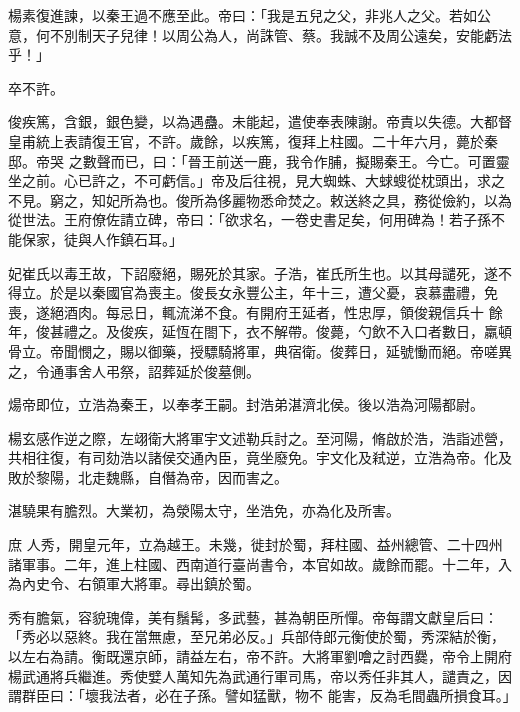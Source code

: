 \begin{pinyinscope}
 楊素復進諫，以秦王過不應至此。帝曰：「我是五兒之父，非兆人之父。若如公意，何不別制天子兒律！以周公為人，尚誅管、蔡。我誠不及周公遠矣，安能虧法乎！」



 卒不許。



 俊疾篤，含銀，銀色變，以為遇蠱。未能起，遣使奉表陳謝。帝責以失德。大都督皇甫統上表請復王官，不許。歲餘，以疾篤，復拜上柱國。二十年六月，薨於秦邸。帝哭
 之數聲而已，曰：「晉王前送一鹿，我令作脯，擬賜秦王。今亡。可置靈坐之前。心已許之，不可虧信。」帝及后往視，見大蜘蛛、大蛷螋從枕頭出，求之不見。窮之，知妃所為也。俊所為侈麗物悉命焚之。敕送終之具，務從儉約，以為從世法。王府僚佐請立碑，帝曰：「欲求名，一卷史書足矣，何用碑為！若子孫不能保家，徒與人作鎮石耳。」



 妃崔氏以毒王故，下詔廢絕，賜死於其家。子浩，崔氏所生也。以其母譴死，遂不得立。於是以秦國官為喪主。俊長女永豐公主，年十三，遭父憂，哀慕盡禮，免喪，遂絕酒肉。每忌日，輒流涕不食。有開府王延者，性忠厚，領俊親信兵十
 餘年，俊甚禮之。及俊疾，延恆在閤下，衣不解帶。俊薨，勺飲不入口者數日，羸頓骨立。帝聞憫之，賜以御藥，授驃騎將軍，典宿衛。俊葬日，延號慟而絕。帝嗟異之，令通事舍人弔祭，詔葬延於俊墓側。



 煬帝即位，立浩為秦王，以奉孝王嗣。封浩弟湛濟北侯。後以浩為河陽都尉。



 楊玄感作逆之際，左翊衛大將軍宇文述勒兵討之。至河陽，脩啟於浩，浩詣述營，共相往復，有司劾浩以諸侯交通內臣，竟坐廢免。宇文化及弒逆，立浩為帝。化及敗於黎陽，北走魏縣，自僭為帝，因而害之。



 湛驍果有膽烈。大業初，為滎陽太守，坐浩免，亦為化及所害。



 庶
 人秀，開皇元年，立為越王。未幾，徙封於蜀，拜柱國、益州總管、二十四州諸軍事。二年，進上柱國、西南道行臺尚書令，本官如故。歲餘而罷。十二年，入為內史令、右領軍大將軍。尋出鎮於蜀。



 秀有膽氣，容貌瑰偉，美有鬚髯，多武藝，甚為朝臣所憚。帝每謂文獻皇后曰：「秀必以惡終。我在當無慮，至兄弟必反。」兵部侍郎元衡使於蜀，秀深結於衡，以左右為請。衡既還京師，請益左右，帝不許。大將軍劉噲之討西爨，帝令上開府楊武通將兵繼進。秀使嬖人萬知先為武通行軍司馬，帝以秀任非其人，譴責之，因謂群臣曰：「壞我法者，必在子孫。譬如猛獸，物不
 能害，反為毛間蟲所損食耳。」




\end{pinyinscope}
